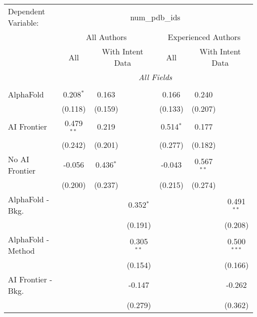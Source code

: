 \begingroup
\centering
\begin{tabular}{lcccccc}
   \tabularnewline \midrule \midrule
   Dependent Variable: & \multicolumn{6}{c}{num\_pdb\_ids}\\
 & \multicolumn{3}{c}{All Authors} & \multicolumn{3}{c}{Experienced Authors} \\
\cmidrule(lr){2-4} \cmidrule(lr){5-7}
 & \multicolumn{1}{c}{All} & \multicolumn{2}{c}{With Intent Data} & \multicolumn{1}{c}{All} & \multicolumn{2}{c}{With Intent Data} \\
\cmidrule(lr){2-2} \cmidrule(lr){3-4} \cmidrule(lr){5-5} \cmidrule(lr){6-7}
 & \multicolumn{6}{c}{\textit{All Fields}} \\ \\
   AlphaFold               & 0.208$^{*}$  & 0.163       &              & 0.166       & 0.240        &   \\   
                           & (0.118)      & (0.159)     &              & (0.133)     & (0.207)      &   \\   
   AI Frontier             & 0.479$^{**}$ & 0.219       &              & 0.514$^{*}$ & 0.177        &   \\   
                           & (0.242)      & (0.201)     &              & (0.277)     & (0.182)      &   \\   
   No AI Frontier          & -0.056       & 0.436$^{*}$ &              & -0.043      & 0.567$^{**}$ &   \\   
                           & (0.200)      & (0.237)     &              & (0.215)     & (0.274)      &   \\   
   AlphaFold - Bkg.        &              &             & 0.352$^{*}$  &             &              & 0.491$^{**}$\\   
                           &              &             & (0.191)      &             &              & (0.208)\\   
   AlphaFold - Method      &              &             & 0.305$^{**}$ &             &              & 0.500$^{***}$\\   
                           &              &             & (0.154)      &             &              & (0.166)\\   
   AI Frontier - Bkg.      &              &             & -0.147       &             &              & -0.262\\   
                           &              &             & (0.279)      &             &              & (0.362)\\   

\end{tabular}
